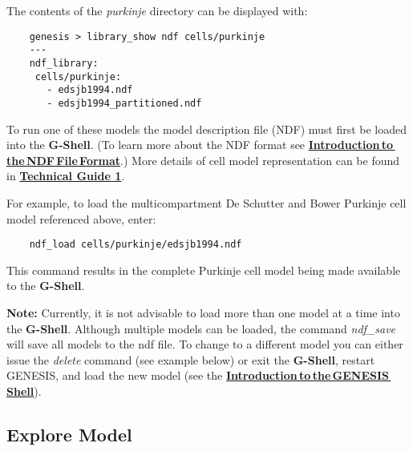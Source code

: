 \documentclass[12pt]{article}
\begin{document}
The contents of the {\it purkinje} directory can be displayed with:
\begin{verbatim}
    genesis > library_show ndf cells/purkinje
    ---
    ndf_library:
     cells/purkinje:
       - edsjb1994.ndf
       - edsjb1994_partitioned.ndf
\end{verbatim}

To run one of these models the model description file (NDF) must first be loaded into the {\bf G-Shell}.  (To learn more
about the NDF format see \href{../ndf-file-format/ndf-file-format.tex}{\bf Introduction\,to\,the\,NDF\,File\,Format}.)
More details of cell model representation can be found in \href{../technical-guide-1/technical-guide-1.tex}
{\bf Technical Guide 1}.

For example, to load the multicompartment De Schutter and Bower Purkinje cell model referenced above, enter:

\begin{verbatim}
    ndf_load cells/purkinje/edsjb1994.ndf
\end{verbatim}
This command results in the complete Purkinje cell model being made available to the {\bf G-Shell}.

{\bf Note:} Currently, it is not advisable to load more than one model at a time into the {\bf G-Shell}. Although multiple models can be loaded, the command {\it ndf\_save} will save all models to the ndf file. To change to a different model you can either issue the {\it delete} command (see example below) or exit the {\bf G-Shell}, restart GENESIS, and load the new model (see the \href{../gshell/gshell.tex}{\bf Introduction\,to\,the\,GENESIS\,Shell}).

\subsection*{Explore Model}
\end{document}

